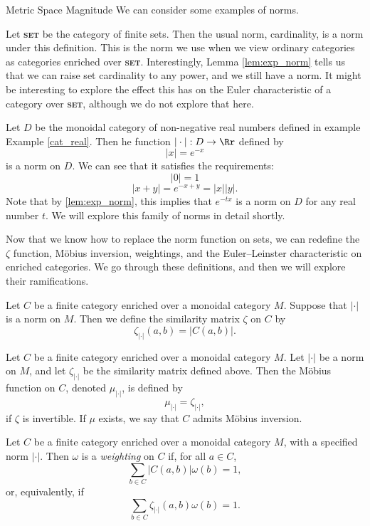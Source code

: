 \documentclass[12pt]{pom_thesis}
\newcommand{\catname}[1]{\textbf{\textsc{#1}}}
\begin{document}
\begin{chapter}{Metric Space Magnitude}
We can consider some examples of norms.
\begin{examp}
Let \catname{set} be the category of finite sets. Then the usual norm, cardinality, is a norm under this definition. This is the norm we use when we view ordinary categories as categories enriched over \catname{set}. Interestingly, Lemma \ref{lem:exp_norm} tells us that we can raise set cardinality to any power, and we still have a norm. It might be interesting to explore the effect this has on the Euler characteristic of a category over \catname{set}, although we do not explore that here.
\end{examp}
\begin{examp}\label{ex:exp_norm}
Let $D$ be the monoidal category of non-negative real numbers defined in example Example \ref{cat_real}. Then he function $|\cdot|:D \rightarrow \Rr$ defined by 
\[
|x| = e^{-x}
\]
is a norm on $D$. We can see that it satisfies the requirements:
\[|0| = 1
\]
\[|x + y| = e^{-x + y} = |x||y|.
\]
Note that by \ref{lem:exp_norm}, this implies that $e^{-tx}$ is a norm on $D$ for any real number $t$. We will explore this family of norms in detail shortly.
\end{examp}

Now that we know how to replace the norm function on sets, we can redefine the $\zeta$ function, M\"obius inversion, weightings, and the Euler--Leinster characteristic on enriched categories. We go through these definitions, and then we will explore their ramifications.
\begin{defn}
Let $C$ be a finite category enriched over a monoidal category $M$. Suppose that $|\cdot|$ is a norm on $M$. Then we define the similarity matrix $\zeta$ on $C$ by
\[
\zeta_{|\cdot|}(a,b) = |C(a,b)|.
\]
\end{defn}

\begin{defn}
Let $C$ be a finite category enriched over a monoidal category $M$. Let $|\cdot|$ be a norm on $M$, and let $\zeta_{|\cdot|}$ be the similarity matrix defined above. Then the M\"obius function on $C$, denoted $\mu_{|\cdot|}$, is defined by 
\[
\mu_{|\cdot|} = \zeta_{|\cdot|},
\]
if $\zeta$ is invertible. If $\mu$ exists, we say that $C$ admits M\"obius inversion.
\end{defn}

\begin{defn}
Let $C$ be a finite category enriched over a monoidal category $M$, with a specified norm $|\cdot|$. Then $\omega$ is a \emph{weighting} on $C$ if, for all $a \in C$, 
\[
\sum_{b \in C}|C(a,b)|\omega(b) = 1,
\]
or, equivalently, if
\[
\sum_{b \in C}\zeta_{|\cdot|}(a,b)\omega(b) = 1.
\]
\end{defn}


\end{chapter}
\end{document}
